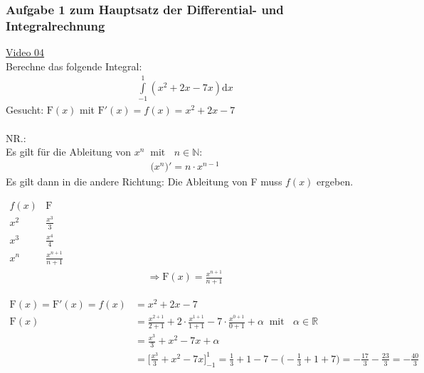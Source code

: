 \subsubsection{Aufgabe 1 zum Hauptsatz der Differential- und Integralrechnung}
\href{https://youtu.be/yEC_tlNWT7E}{Video 04}\\
Berechne das folgende Integral:\\
\begin{align*}
\int\limits_{-1}^{1} (x^2+2x-7x)\mathrm{d}x
\end{align*}
Gesucht: $ \mathrm{F}(x) $ mit $ \mathrm{F}'(x)=f(x)=x^2+2x-7 $\\
\\
NR.:\\
Es gilt für die Ableitung von $ x^n \;\;\text{mit }\;\;n\in\mathbb{N} $:\\
\begin{align*}
\big(x^n\big)'=n\cdot x^{n-1}
\end{align*}
\newpage
Es gilt dann in die andere Richtung: Die Ableitung von F muss $ f(x) $ ergeben.\\
\begin{center}
	
	
	\renewcommand{\arraystretch}{1.4}
	\( \begin{array}{l|c} f(x)&\mathrm{F}\\
	\hline x^2&\frac{x^3}{3}\\
	x^3&\frac{x^4}{4}\\
	x^n&\frac{x^{n+1}}{n+1}
	\end{array} \)
	\begin{align*}
	\Rightarrow \mathrm{F}(x)=\frac{x^{n+1}}{n+1}
	\end{align*}
\end{center}
\begin{align*}
\mathrm{F}(x)= \mathrm{F}'(x)=f(x)&=x^2+2x-7\\
\mathrm{F}(x)&=\frac{x^{2+1}}{2+1}+2\cdot\frac{x^{1+1}}{1+1}-7\cdot\frac{x^{0+1}}{0+1}+\alpha\;\;\text{mit }\;\; \alpha\in\mathbb{R}\\
&=\frac{x^3}{3}+x^2-7x+\alpha\\
&=\bigg[\frac{x^3}{3}+x^2-7x\bigg]^1_{-1}=\frac{1}{3}+1-7-\bigg(-\frac{1}{3}+1+7\bigg)=-\frac{17}{3}-\frac{23}{3}=-\frac{40}{3}\\
\end{align*}

